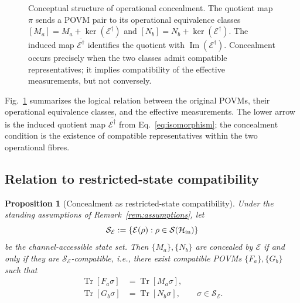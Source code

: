 \documentclass[
aps,pra,twocolumn,10pt,
superscriptaddress,longbibliography,floatfix
]{revtex4-2}
\DeclareMathOperator{\Tr}{Tr}
\DeclareMathOperator{\im}{Im}
\newtheorem{proposition}[theorem]{Proposition}
\begin{document}
\begin{figure}[tbp]
\centering
{}

\caption{
Conceptual structure of operational concealment.
The quotient map $\pi$ sends a POVM pair to its operational equivalence classes $[M_a]=M_a+\ker(\mathcal E^\dagger)$ and $[N_b]=N_b+\ker(\mathcal E^\dagger)$. The induced map $\overline{\mathcal E^\dagger}$ identifies the quotient with $\im(\mathcal E^\dagger)$. Concealment occurs precisely when the two classes admit compatible representatives; it implies compatibility of the effective measurements, but not conversely.
}
\label{fig:concealment_diagram}
\end{figure}

Fig.~\ref{fig:concealment_diagram} summarizes the logical relation between the original POVMs, their operational equivalence classes, and the effective measurements. The lower arrow is the induced quotient map $\overline{\mathcal E^\dagger}$ from Eq.~\eqref{eq:isomorphism}; the concealment condition is the existence of compatible representatives within the two operational fibres.

\subsection{Relation to restricted-state compatibility}

\begin{proposition}[Concealment as restricted-state compatibility]
\label{prop:restricted_state}
Under the standing assumptions of Remark~\ref{rem:assumptions}, let
\[
\mathcal S_{\mathcal E}:=\{\mathcal E(\rho):\rho\in\mathcal S(\mathcal H_{\rm in})\}
\]
be the channel-accessible state set. Then $\{M_a\},\{N_b\}$ are concealed by $\mathcal E$ if and only if they are $\mathcal S_{\mathcal E}$-compatible, i.e., there exist compatible POVMs $\{F_a\},\{G_b\}$ such that
\begin{align*}
\Tr[F_a\sigma]&=\Tr[M_a\sigma],\\
\Tr[G_b\sigma]&=\Tr[N_b\sigma],
\qquad \sigma\in\mathcal S_{\mathcal E}.
\end{align*}
\end{proposition}
\end{document}
